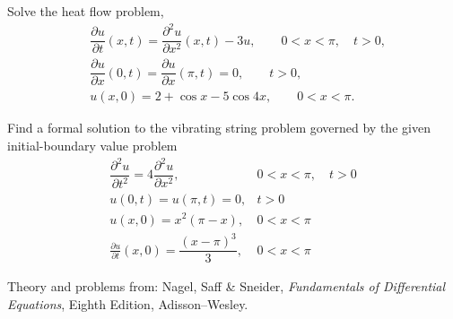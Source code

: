 \documentclass[11pt]{article}
\begin{document}
\begin{problem}
Solve the heat flow problem,
\begin{equation*} 
\begin{split}
& \dfrac{\partial u }{\partial t } (x,t) = \dfrac{\partial^2 u}{\partial x^2}(x,t) -3u, \qquad 0<x<\pi, \quad t>0, \\
& \dfrac{\partial u }{\partial x } (0,t) = \dfrac{\partial u }{\partial x } (\pi,t)=0, \qquad t>0, \\
& u(x,0) = 2 + \cos x - 5 \cos 4x, \qquad 0<x<\pi.
\end{split}
\end{equation*}
\end{problem}


\begin{problem}
Find a formal solution to the vibrating string problem governed by the given initial-boundary value problem
\begin{equation*} \begin{array}{lr}
\dfrac{ \partial^2 u }{\partial t^2} =  4 \dfrac{ \partial^2 u }{\partial x^2} , & 0<x<\pi, \quad t>0 \\
 u(0,t)  =  u(\pi,t) =0,  & t>0 \\
 u(x,0)  =  x^2(\pi-x), & 0<x<\pi \\
 \frac{ \partial u }{\partial t}(x,0) =  \dfrac{(x-\pi)^3}{3}, & 0<x<\pi 
\end{array}\end{equation*}
\end{problem}











\LabSolutions


Theory and problems from: Nagel, Saff \& Sneider, \textit{Fundamentals of Differential Equations}, Eighth Edition, Adisson--Wesley.
\end{document}
